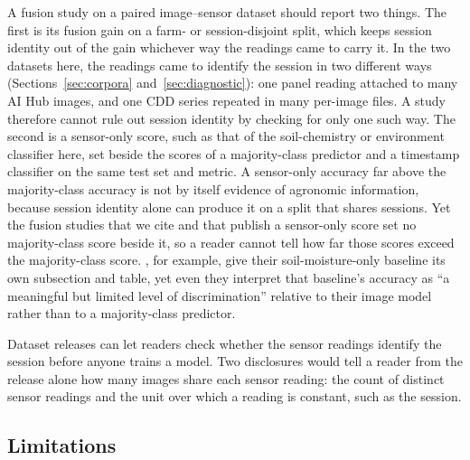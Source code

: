 \documentclass[preprint,12pt,authoryear,nopreprintline]{elsarticle}
\begin{document}
A fusion study on a paired image--sensor dataset should report two things. The first is its fusion gain on a farm- or session-disjoint split, which keeps session
identity out of the gain whichever way the readings came to carry it. In the two datasets
here, the readings came to identify the session in two different
ways (Sections~\ref{sec:corpora} and~\ref{sec:diagnostic}): one panel reading attached to
many AI Hub images, and one CDD series repeated in many per-image files. A study
therefore cannot rule out session identity by checking for only one such way. The second is a sensor-only score, such as that of the soil-chemistry or environment
classifier here, set beside the scores of a majority-class predictor and
a timestamp classifier on the same test set and metric. A sensor-only accuracy far above the majority-class accuracy is not by itself evidence of agronomic
information, because session identity alone can produce it on a split that shares
sessions. Yet the fusion studies that we cite and that publish a sensor-only score
\citep{berrocal2026,agrifusion2026,jamun2025iot,cornsentry2026,appliedsci2024dacon,xu2025wheat}
set no majority-class score beside it, so a reader cannot tell how far those scores
exceed the majority-class score. \citet{berrocal2026}, for example, give their soil-moisture-only
baseline its own subsection and table, yet even they interpret that baseline's
accuracy as ``a meaningful but limited level of discrimination'' relative to their
image model rather than to a majority-class predictor.

Dataset releases can let readers check whether the sensor readings identify the
session before anyone trains a model. Two disclosures would tell a reader from the
release alone how many images share each sensor reading: the count of distinct sensor
readings and the unit over which a reading is constant, such as the session.

\subsection{Limitations}
\end{document}
